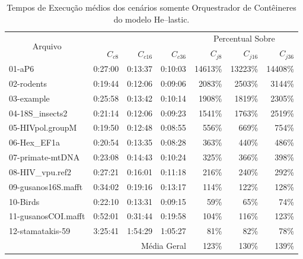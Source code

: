 \documentclass[english,brazilian]{UNISINOSmonografia} %
\begin{document}
\begin{table}[tb]
	\centering%
	\begin{minipage}{\textwidth}
		\caption{Tempos de Execução médios dos cenários somente Orquestrador de Contêineres do modelo \textsf{He}--lastic.}
		\label{tab:results-modelo-batch-computacao}
		\vspace{1ex}
		\begin{tabularx}{\textwidth}{@{\extracolsep{\fill}}lrrrrrr@{}}
			\toprule
			\multicolumn{1}{c}{\multirow{2}{*}{Arquivo}} &  &  &  & \multicolumn{3}{c}{Percentual Sobre} \\ \cmidrule(l){5-7} 
			\multicolumn{1}{c}{} & $C_{c8}$ & $C_{c16}$ & $C_{c36}$ & $C_{j8}$ & $C_{j16}$ & $C_{j36}$ \\ 
			\midrule
			01-aP6 & 0:27:00 & 0:13:37 & 0:10:03 & 14613\% & 13223\% & 14408\% \\
			02-rodents & 0:19:44 & 0:12:06 & 0:09:06 & 2083\% & 2503\% & 3144\% \\
			03-example & 0:25:58 & 0:13:42 & 0:10:14 & 1908\% & 1819\% & 2305\% \\
			04-18S\_insects2 & 0:21:14 & 0:12:06 & 0:09:23 & 1541\% & 1763\% & 2519\% \\
			05-HIVpol.groupM & 0:19:50 & 0:12:48 & 0:08:55 & 556\% & 669\% & 754\% \\
			06-Hex\_EF1a & 0:20:54 & 0:13:35 & 0:08:28 & 363\% & 440\% & 486\% \\
			07-primate-mtDNA & 0:23:08 & 0:14:43 & 0:10:24 & 325\% & 366\% & 398\% \\
			08-HIV\_vpu.ref2 & 0:27:21 & 0:16:01 & 0:11:18 & 216\% & 240\% & 292\% \\
			09-gusanos16S.mafft & 0:34:02 & 0:19:16 & 0:13:17 & 114\% & 122\% & 128\% \\
			10-Birds & 0:22:10 & 0:13:31 & 0:09:15 & 59\% & 65\% & 74\% \\
			11-gusanosCOI.mafft & 0:52:01 & 0:31:44 & 0:19:58 & 104\% & 116\% & 123\% \\
			12-stamatakis-59 & 3:25:41 & 1:54:29 & 1:05:27 & 81\% & 82\% & 78\% \\
			\bottomrule
			\multicolumn{4}{r}{Média Geral} & 123\% & 130\% & 139\% \\ 
		\end{tabularx}
	\end{minipage}
\end{table}
\end{document}
